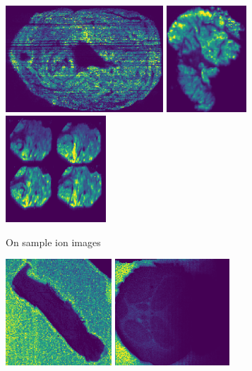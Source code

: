\documentclass[a4paper]{article}
\begin{document}
\begin{figure}[H]
    \begin{subfigure}[b]{\textwidth}
        \centering
        \includegraphics[width=\textwidth,height=4cm,keepaspectratio]{on_sample_1.png}
        \includegraphics[width=\textwidth,height=4cm,keepaspectratio]{on_sample_2.png}
        \includegraphics[width=\textwidth,height=4cm,keepaspectratio]{on_sample_3.png}
        \caption{On sample ion images}
    \end{subfigure}
    \begin{subfigure}[b]{\textwidth}
        \centering
        \includegraphics[width=\textwidth,height=4cm,keepaspectratio]{off_sample_1.png}
        \includegraphics[width=\textwidth,height=4cm,keepaspectratio]{off_sample_2.png}

\end{subfigure}
\end{figure}
\end{document}
